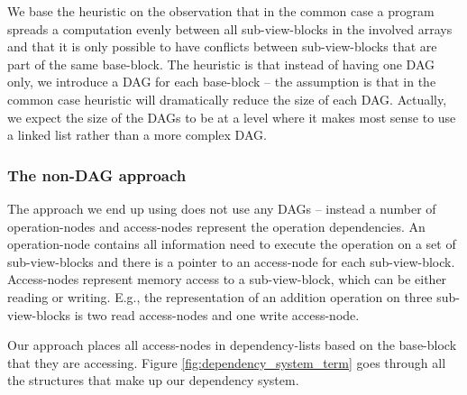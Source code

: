\documentclass[preprint]{../PGAS10/sigplanconf}
\begin{document}
We base the heuristic on the observation that in the common case a program spreads a computation evenly between all sub-view-blocks in the involved arrays and that it is only possible to have conflicts between sub-view-blocks that are part of the same base-block. The heuristic is that instead of having one DAG only, we introduce a DAG for each base-block -- the assumption is that in the common case heuristic will dramatically reduce the size of each DAG. Actually, we expect the size of the DAGs to be at a level where it makes most sense to use a linked list rather than a more complex DAG.


\subsubsection{The non-DAG approach}
The approach we end up using does not use any DAGs -- instead a number of operation-nodes and access-nodes represent the operation dependencies. An operation-node contains all information need to execute the operation on a set of sub-view-blocks and there is a pointer to an access-node for each sub-view-block. Access-nodes represent memory access to a sub-view-block, which can be either reading or writing. E.g., the representation of an addition operation on three sub-view-blocks is two read access-nodes and one write access-node. 

Our approach places all access-nodes in dependency-lists based on the base-block that they are accessing. Figure \ref{fig:dependency_system_term} goes through all the structures that make up our dependency system.

\end{document}
